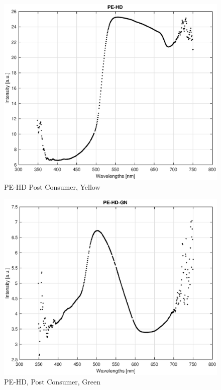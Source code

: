 \begin{appendices}
\begin{figure}
    \centering
    \includegraphics[width = 12cm]{Images/appendix/pe-hd-postconsum.eps}
    \caption[$\; \:$PE-HD Post Consumer, Yellow]{PE-HD Post Consumer, Yellow}
    \label{fig:pehd-yellow}
\end{figure}

\begin{figure}
    \centering
    \includegraphics[width = 12cm]{Images/appendix/pe-hd-postconsumer-green.eps}
    \caption[$\; \:$PE-HD Post Consumer, Green]{PE-HD, Post Consumer, Green}
    \label{fig:pehd-green}
\end{figure}


\end{appendices}
